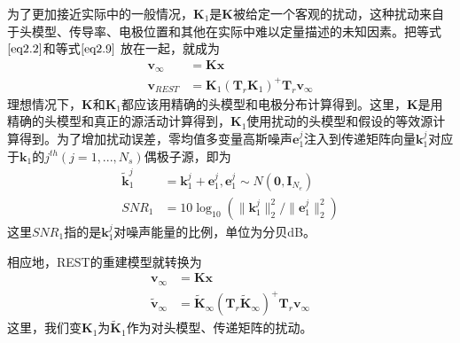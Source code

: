 为了更加接近实际中的一般情况，$\mathbf{K}_1$是$\mathbf{K}$被给定一个客观的扰动，这种扰动来自于头模型、传导率、电极位置和其他在实际中难以定量描述的未知因素。把等式$\eqref{eq2.2}$和等式$\eqref{eq2.9}$
放在一起，就成为
\begin{equation*}
\begin{split}
\mathbf{v}_{\infty}& =\mathbf{Kx}\\
\mathbf{v}_{REST}&
=\mathbf{K}_1(\mathbf{T}_r\mathbf{K}_1)^{+}\mathbf{T}_{r}\mathbf{v}_{\infty}
\end{split}
\end{equation*}
理想情况下，$\mathbf{K}$和$\mathbf{K}_1$都应该用精确的头模型和电极分布计算得到。这里，$\mathbf{K}$是用精确的头模型和真正的源活动计算得到，$\mathbf{K}_1$使用扰动的头模型和假设的等效源计算得到。为了增加扰动误差，零均值多变量高斯噪声$\mathbf{e}_1^j$注入到传递矩阵向量$\mathbf{k}_1^j$对应于$\mathbf{k}_1$的$j^{th}(j=1,...,N_s)$偶极子源，即为
\begin{equation*}
\begin{split}
\tilde{\mathbf{k}}_1^j& =\mathbf{k}_1^j+\mathbf{e}_1^j,\mathbf{e}_1^j\sim{N(\mathbf{0},\mathbf{I}_{N_e})}\\
SNR_1& =10\log_{10}(\lVert\mathbf{k}_1^{j}\rVert_2^2/{\lVert\mathbf{e}_1^{j}\rVert_2^2})
\end{split}
\end{equation*}
这里$SNR_1$指的是$\mathbf{k}_1^j$对噪声能量的比例，单位为分贝dB。

相应地，REST的重建模型就转换为
\begin{equation}\label{eq2.10}
\begin{split}
\mathbf{v}_{\infty}& =\mathbf{Kx}\\
\tilde{\mathbf{v}}_{\infty}& =\tilde{\mathbf{K}}_{\infty}(\mathbf{T}_{r}\tilde{\mathbf{K}}_{\infty})^{+}\mathbf{T}_{r}\mathbf{v}_{\infty}
\end{split}
\end{equation}
这里，我们变$\mathbf{K}_1$为$\tilde{\mathbf{K}}_1$作为对头模型、传递矩阵的扰动。

